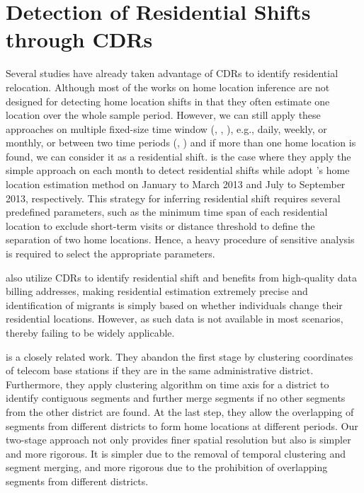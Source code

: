 

\section{Detection of Residential Shifts through CDRs}\label{sec:2_detection_of_residential_shifts_through_cdrs}
Several studies have already taken advantage of CDRs to identify residential relocation.
Although most of the works on home location inference are not designed for detecting home location shifts in that they often estimate one location over the whole sample period.
However, we can still apply these approaches on multiple fixed-size time window (\cite{blumenstock2012inferring}, \cite{phithakkitnukoon2022inferring}, \cite{blumenstock2025migration}), e.g., daily, weekly, or monthly, or between two time periods (\cite{lai2019exploring}, \cite{dias2022framework}) and if more than one home location is found, we can consider it as a residential shift.
\cite{phithakkitnukoon2022inferring} is the case where they apply the simple approach on each month to detect residential shifts while \cite{dias2022framework} adopt \cite{isaacman2011identifying}'s home location estimation method on January to March 2013 and July to September 2013, respectively.
This strategy for inferring residential shift requires several predefined parameters, such as the minimum time span of each residential location to exclude short-term visits or distance threshold to define the separation of two home locations.
Hence, a heavy procedure of sensitive analysis is required to select the appropriate parameters.

\cite{buchel2020calling} also utilize CDRs to identify residential shift and benefits from high-quality data billing addresses, making residential estimation extremely precise and identification of migrants is simply based on whether individuals change their residential locations.
However, as such data is not available in most scenarios, thereby failing to be widely applicable.

\cite{chi2020general} is a closely related work.
They abandon the first stage by clustering coordinates of telecom base stations if they are in the same administrative district.
Furthermore, they apply clustering algorithm on time axis for a district to identify contiguous segments and further merge segments if no other segments from the other district are found.
At the last step, they allow the overlapping of segments from different districts to form home locations at different periods.
Our two-stage approach not only provides finer spatial resolution but also is simpler and more rigorous. It is simpler due to the removal of temporal clustering and segment merging, and more rigorous due to the prohibition of overlapping segments from different districts.

